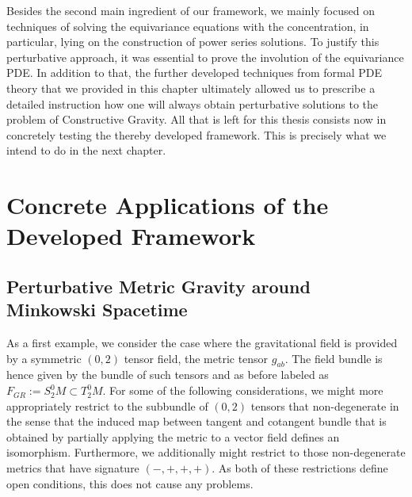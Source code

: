 \documentclass[a4paper,12pt, DIV=14, BCOR=5mm, twoside, headsepline, numbers=noenddot]{scrbook}
\begin{document}
Besides the second main ingredient of our framework, we mainly focused on techniques of solving the equivariance equations with the concentration, in particular, lying on the construction of power series solutions. To justify this perturbative approach, it was essential to prove the involution of the equivariance PDE. In addition to that, the further developed techniques from formal PDE theory that we provided in this chapter ultimately allowed us to prescribe a detailed instruction how one will always obtain perturbative solutions to the problem of Constructive Gravity.  All that is left for this thesis consists now in concretely testing the thereby developed framework. This is precisely what we intend to do in the next chapter.


\chapter{Concrete Applications of the Developed Framework}
\section{Perturbative Metric Gravity around Minkowski Spacetime}
As a first example, we consider the case where the gravitational field is provided by a symmetric $(0,2)$ tensor field, the metric tensor $g_{ab}$. The field bundle is hence given by the bundle of such tensors and as before labeled as $F_{GR} := S^0_2M \subset T^0_2M$. For some of the following considerations, we might more appropriately restrict to the subbundle of $(0,2)$ tensors that non-degenerate in the sense that the induced map between tangent and cotangent bundle that is obtained by partially applying the metric to a vector field defines an isomorphism. Furthermore, we additionally might restrict to those non-degenerate metrics that have signature $(-,+,+,+)$. As both of these restrictions define open conditions, this does not cause any problems.
\end{document}
